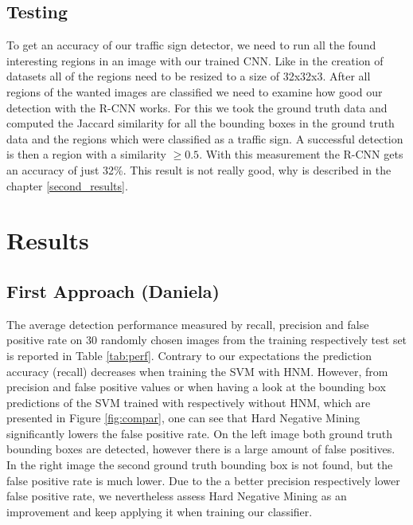 \documentclass[12pt,a4paper,bibliography=totocnumbered,listof=totocnumbered]{scrartcl}
\begin{document}
\subsection{Testing}

To get an accuracy of our traffic sign detector, we need to run all the found interesting regions in an image with our trained CNN. Like in the creation of datasets all of the regions need to be resized to a size of 32x32x3. After all regions of the wanted images are classified we need to examine how good our detection with the R-CNN works. For this we took the ground truth data and computed the Jaccard similarity for all the bounding boxes in the ground truth data and the regions which were classified as a traffic sign. A successful detection is then a region with a similarity $\geq 0.5$. With this measurement the R-CNN gets an accuracy of just 32\%. This result is not really good, why is described in the chapter \ref{second_results}.

\pagebreak
\section{Results}
\subsection{First Approach \small{(Daniela)}}

The average detection performance measured by recall, precision and false positive rate on 30 randomly chosen images from the training respectively test set is reported in Table \ref{tab:perf}. Contrary to our expectations the prediction accuracy (recall) decreases when training the SVM with HNM. However, from precision and false positive values or when having a look at the bounding box predictions of the SVM trained with respectively without HNM, which are presented in Figure \ref{fig:compar}, one can see that Hard Negative Mining significantly lowers the false positive rate. On the left image both ground truth bounding boxes are detected, however there is a large amount of false positives. In the right image the second ground truth bounding box is not found, but the false positive rate is much lower. Due to the a better precision respectively lower false positive rate, we nevertheless assess Hard Negative Mining as an improvement and keep applying it when training our classifier.
\end{document}
